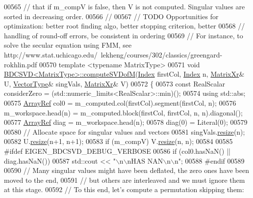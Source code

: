 \begin{DoxyCode}
00565 \textcolor{comment}{// that if m\_compV is false, then V is not computed. Singular values are sorted in decreasing order.}
00566 \textcolor{comment}{//}
00567 \textcolor{comment}{// TODO Opportunities for optimization: better root finding algo, better stopping criterion, better}
00568 \textcolor{comment}{// handling of round-off errors, be consistent in ordering}
00569 \textcolor{comment}{// For instance, to solve the secular equation using FMM, see
       http://www.stat.uchicago.edu/~lekheng/courses/302/classics/greengard-rokhlin.pdf}
00570 \textcolor{keyword}{template} <\textcolor{keyword}{typename} MatrixType>
00571 \textcolor{keywordtype}{void} \hyperlink{group___s_v_d___module_class_eigen_1_1_b_d_c_s_v_d}{BDCSVD<MatrixType>::computeSVDofM}(\hyperlink{namespace_eigen_a62e77e0933482dafde8fe197d9a2cfde}{Index} firstCol, 
      \hyperlink{namespace_eigen_a62e77e0933482dafde8fe197d9a2cfde}{Index} n, \hyperlink{group___core___module}{MatrixXr}& U, \hyperlink{group___core___module}{VectorType}& singVals, \hyperlink{group___core___module}{MatrixXr}& V)
00572 \{
00573   \textcolor{keyword}{const} RealScalar considerZero = (std::numeric\_limits<RealScalar>::min)();
00574   \textcolor{keyword}{using} std::abs;
00575   \hyperlink{group___core___module_class_eigen_1_1_ref}{ArrayRef} col0 = m\_computed.col(firstCol).segment(firstCol, n);
00576   m\_workspace.head(n) =  m\_computed.block(firstCol, firstCol, n, n).diagonal();
00577   \hyperlink{group___core___module_class_eigen_1_1_ref}{ArrayRef} diag = m\_workspace.head(n);
00578   diag(0) = Literal(0);
00579 
00580   \textcolor{comment}{// Allocate space for singular values and vectors}
00581   singVals.\hyperlink{class_eigen_1_1_plain_object_base_a99d9054ee2d5a40c6e00ded0265e9cea}{resize}(n);
00582   U.\hyperlink{class_eigen_1_1_plain_object_base_a99d9054ee2d5a40c6e00ded0265e9cea}{resize}(n+1, n+1);
00583   \textcolor{keywordflow}{if} (m\_compV) V.\hyperlink{class_eigen_1_1_plain_object_base_a99d9054ee2d5a40c6e00ded0265e9cea}{resize}(n, n);
00584 
00585 \textcolor{preprocessor}{#ifdef EIGEN\_BDCSVD\_DEBUG\_VERBOSE}
00586   \textcolor{keywordflow}{if} (col0.hasNaN() || diag.hasNaN())
00587     std::cout << \textcolor{stringliteral}{"\(\backslash\)n\(\backslash\)nHAS NAN\(\backslash\)n\(\backslash\)n"};
00588 \textcolor{preprocessor}{#endif}
00589   
00590   \textcolor{comment}{// Many singular values might have been deflated, the zero ones have been moved to the end,}
00591   \textcolor{comment}{// but others are interleaved and we must ignore them at this stage.}
00592   \textcolor{comment}{// To this end, let's compute a permutation skipping them:}

\end{DoxyCode}
